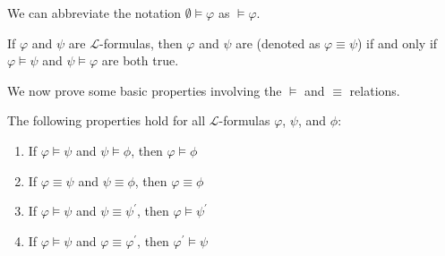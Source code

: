 \begin{notation}
    We can abbreviate the notation \( \emptyset \models \varphi \) as \( \models \varphi \).
\end{notation}

\begin{dfn}
     \label{dfn:first-order-language-logical-equivalence}
    If \( \varphi \) and \( \psi \) are \( \mathcal{L} \)-formulas, then \( \varphi \) and \( \psi \) are 
    (denoted as \( \varphi \equiv \psi \)) if and only if \( \varphi \models \psi \) and \( \psi \models \varphi \) are both true.
\end{dfn}

\noindent
We now prove some basic properties involving the \( \models \) and \( \equiv \) relations.

\begin{thm}[Transitivity]
     \label{thm:first-order-language-transitivity-of-logical-consequence-and-equivalence}
    The following properties hold for all \( \mathcal{L} \)-formulas \( \varphi \), \( \psi \), and \( \phi \):
    \begin{enumerate}[topsep=2pt,label=\textup{\texttt{(\alph*)}}]
        \item If \( \varphi \models \psi \) and \( \psi \models \phi \), then \( \varphi \models \phi \)  \label{enum:transitivity-of-consequence}
        \item If \( \varphi \equiv \psi \) and \( \psi \equiv \phi \), then \( \varphi \equiv \phi \)  \label{enum:transitivity-of-equivalence}
        \item If \( \varphi \models \psi \) and \( \psi \equiv \psi^{\prime} \), then \( \varphi \models \psi^{\prime} \)  \label{enum:sub-consequence}
        \item If \( \varphi \models \psi \) and \( \varphi \equiv \varphi^{\prime} \), then \( \varphi^{\prime} \models \psi \)  \label{enum:sub-antecedence}
    \end{enumerate}
\end{thm}

